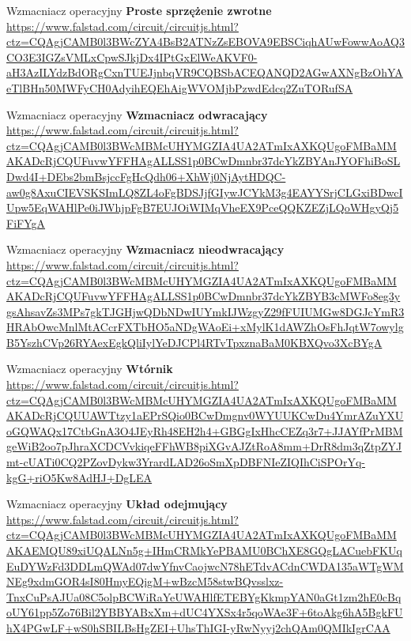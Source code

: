 \begin{frame}{Wzmacniacz operacyjny}
	\textbf{Proste sprzężenie zwrotne}\\
	\url{https://www.falstad.com/circuit/circuitjs.html?ctz=CQAgjCAMB0l3BWcZYA4BsB2ATNzZsEBOVA9EBSCiqhAUwFowwAoAQ3CO3E3IGZsVMLxCpwSJkjDx4IPtGxElWeAKVF0-aH3AzILYdzBdORgCxnTUEJjnbqVR9CQBSbACEQANQD2AGwAXNgBzOhYAeTlBHn50MWFyCH0AdyihEQEhAigWVOMjbPzwdEdcq2ZuTORufSA}
\end{frame}

\begin{frame}{Wzmacniacz operacyjny}
	\textbf{Wzmacniacz odwracający}\\
	\url{https://www.falstad.com/circuit/circuitjs.html?ctz=CQAgjCAMB0l3BWcMBMcUHYMGZIA4UA2ATmIxAXKQUgoFMBaMMAKADcRjCQUFuvwYFFHAgALLSS1p0BCwDmnbr37dcYkZBYAnJYOFhiBoSLDwd4I+DEbs2bmBsjccFgHcQdh06+XhWj0NjAytHDQC-aw0g8AxuCIEVSKSImLQ8ZL4oFgBDSJjfGIywJCYkM3g4EAYYSrjCLGxiBDwcIUpw5EqWAHlPe0iJWhjpFgB7EUJOiWIMqVheEX9PceQQKZEZjLQoWHgyQj5FiFYgA}
\end{frame}

\begin{frame}{Wzmacniacz operacyjny}
	\textbf{Wzmacniacz nieodwracający}\\
	\url{https://www.falstad.com/circuit/circuitjs.html?ctz=CQAgjCAMB0l3BWcMBMcUHYMGZIA4UA2ATmIxAXKQUgoFMBaMMAKADcRjCQUFuvwYFFHAgALLSS1p0BCwDmnbr37dcYkZBYB3cMWFo8eg3ygsAhsavZs3MPs7gkTJGHjwQDbNDwIUYmkIJWzgyZ29fFUIUMGw8DGJcYmR3HRAbOwcMnlMtACcrFXTbHO5aNDgWAoEi+xMylK1dAWZhOsFhJqtW7owylgB5YszhCVp26RYAexEgkQliIylYeDJCPl4RTvTpxznaBaM0KBXQvo3XcBYgA}
\end{frame}

\begin{frame}{Wzmacniacz operacyjny}
	\textbf{Wtórnik}\\
	\url{https://www.falstad.com/circuit/circuitjs.html?ctz=CQAgjCAMB0l3BWcMBMcUHYMGZIA4UA2ATmIxAXKQUgoFMBaMMAKADcRjCQUUAWTtzy1aEPrSQio0BCwDmgnv0WYUUKCwDu4YmrAZuYXUoGQWAQx17CtbGnA3O4JEyRh48EH2h4+GBGgIxHhcCEZq3r7+JJAYfPrMBMgeWiB2oo7pJhraXCDCVvkiqeFFhWB8piXGvAJZtRoA8mm+DrR8dm3qZtpZYJmt-cUATi0CQ2PZovDykw3YrardLAD26oSmXpDBFNIeZIQIhCiSPOrYq-kgG+riO5Kw8AdHJ+DgLEA}
\end{frame}

\begin{frame}{Wzmacniacz operacyjny}
	\textbf{Układ odejmujący}\\
	\url{https://www.falstad.com/circuit/circuitjs.html?ctz=CQAgjCAMB0l3BWcMBMcUHYMGZIA4UA2ATmIxAXKQUgoFMBaMMAKAEMQU89xiUQALNn5g+IHmCRMkYePBAMU0BChXE8GQgLACuebFKUqEuDYWzFd3DDLmQWAd07dwYfnvCaojwcN78hETdvACdnCWDA135aWTgWMNEg9xdmGOR4sI80HmyEQigM+wBzcM58stwBQvsslxz-TnxCuPsAJUa08C5olpBCWiRaYeUWAHlfETEBYgKkmpYAN0aGt1zm2hE0cBqoUY61pp5Zo76Bil2YBBYABxXm+dUC4YXSx4r5qoWAe3F+6toAkg6hA5BgkFUhX4PGwLF+wS0hSBILBsHgZEI+UhsThIGI-yRwNyyj2chQAm0QMIkIgrCAA}
\end{frame}

